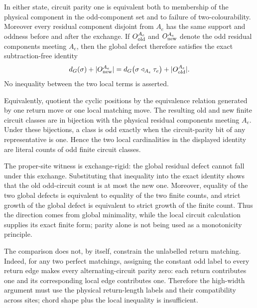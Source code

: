 \begin{lemma}
In either state, circuit parity one is equivalent both to membership of the
physical component in the odd-component set and to failure of
two-colourability.  Moreover every residual component disjoint from \(A_e\)
has the same support and oddness before and after the exchange.  If
\(O_{\rm old}^{A_e}\) and \(O_{\rm new}^{A_e}\) denote the odd residual
components meeting \(A_e\), then the global defect therefore satisfies the
exact subtraction-free identity
\[
 d_G(\sigma)+|O_{\rm new}^{A_e}|=
 d_G\bigl(\sigma\mathbin\triangleleft_{A_e}\tau_e\bigr)
   +|O_{\rm old}^{A_e}|.
\]
No inequality between the two local terms is asserted.

Equivalently, quotient the cyclic positions by the equivalence relation
generated by one return move or one local matching move.  The resulting old
and new finite circuit classes are in bijection with the physical residual
components meeting \(A_e\).  Under these bijections, a class is odd exactly
when the circuit-parity bit of any representative is one.  Hence the two
local cardinalities in the displayed identity are literal counts of odd
finite circuit classes.

The proper-site witness is exchange-rigid: the global residual defect cannot
fall under this exchange.  Substituting that inequality into the exact
identity shows that the old odd-circuit count is at most the new one.
Moreover, equality of the two global defects is equivalent to equality of the
two finite counts, and strict growth of the global defect is equivalent to
strict growth of the finite count.  Thus the direction comes from global
minimality, while the local circuit calculation supplies its exact finite
form; parity alone is not being used as a monotonicity principle.

The comparison does not, by itself, constrain the unlabelled return matching.
Indeed, for any two perfect matchings, assigning the constant odd label to
every return edge makes every alternating-circuit parity zero: each return
contributes one and its corresponding local edge contributes one.  Therefore
the high-width argument must use the physical return-length labels and their
compatibility across sites; chord shape plus the local inequality is
insufficient.
\end{lemma}

